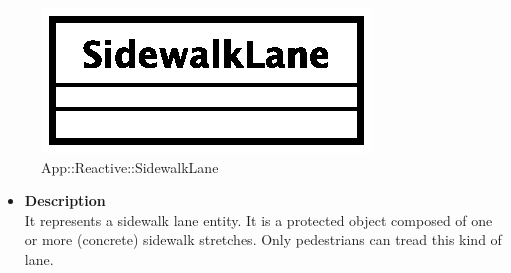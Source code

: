 \begin{figure}[h]
\centering
\includegraphics[scale=0.6,keepaspectratio]{images/solution/sidewalk_lane.eps}
\caption{App::Reactive::SidewalkLane}
\label{fig:sd-app-sidewalk_lane}
\end{figure}
\FloatBarrier
\begin{itemize}
  \item \textbf{Description} \\
    It represents a sidewalk lane entity. It is a protected object composed of
    one or more (concrete) sidewalk stretches. Only pedestrians can tread this
    kind of lane. 
\end{itemize}
